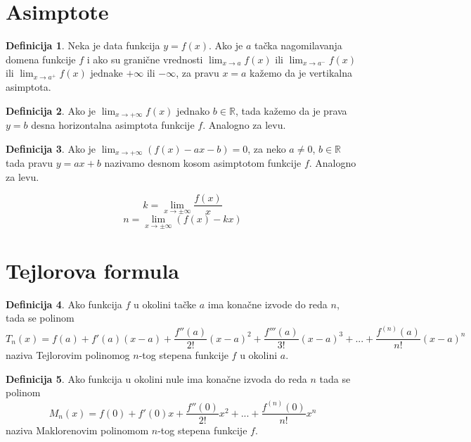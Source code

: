 \documentclass{article}
\theoremstyle{definition}
\newtheorem{definition}{Definicija}[section]
\begin{document}
    \section{Asimptote}
        \begin{definition}
            Neka je data funkcija $y = f(x)$. Ako je $a$ tačka nagomilavanja domena funkcije $f$ i ako su granične vrednosti $\lim_{x \to a} f(x)$ ili $\lim_{x \to a^{-}} f(x)$ ili $\lim_{x \to a^{+}} f(x)$ jednake $+\infty$ ili $-\infty$, za pravu $x = a$ kažemo da je vertikalna asimptota.
        \end{definition}

        \begin{definition}
            Ako je $\lim_{x \to +\infty} f(x)$ jednako $b \in \mathbb{R}$, tada kažemo da je prava $y = b$ desna horizontalna asimptota funkcije $f$. Analogno za levu.
        \end{definition}

        \begin{definition}
            Ako je $\lim_{x \to +\infty} (f(x) - ax - b) = 0$, za neko $a \neq 0$, $b \in \mathbb{R}$ tada pravu $y = ax + b$ nazivamo desnom kosom asimptotom funkcije $f$. Analogno za levu.
        \end{definition}

        $$k = \lim_{x \to \pm \infty} \frac{f(x)}{x}$$
        $$n = \lim_{x \to \pm \infty} (f(x) - kx)$$

    \section{Tejlorova formula}
        \begin{definition}
            Ako funkcija $f$ u okolini tačke $a$ ima konačne izvode do reda $n$, tada se polinom
            $$T_n(x) = f(a) + f'(a)(x - a) + \frac{f''(a)}{2!}(x - a)^2 + \frac{f'''(a)}{3!}(x - a)^3 + ... + \frac{f^{(n)}(a)}{n!}(x - a)^n$$
            naziva Tejlorovim polinomog $n$-tog stepena funkcije $f$ u okolini $a$.
        \end{definition}

        \begin{definition}
            Ako funkcija u okolini nule ima konačne izvoda do reda $n$ tada se polinom
            $$M_n(x) = f(0) + f'(0)x + \frac{f''(0)}{2!}x^2 + ... + \frac{f^{(n)}(0)}{n!}x^n$$
            naziva Maklorenovim polinomom $n$-tog stepena funkcije $f$.
        \end{definition}
\end{document}
